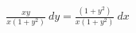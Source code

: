\documentclass[preview]{standalone}
\begin{document}
\begin{align*}
\frac{x y}{x \left( 1 + {y}^{2} \right)} \  dy = \frac{\left( 1 + {y}^{2} \right)}{x \left( 1 + {y}^{2} \right)} \  dx
\end{align*}
\end{document}
